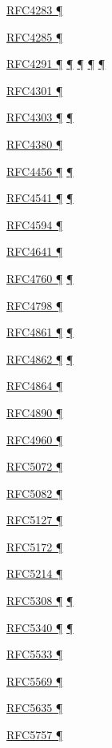 \documentclass[
]{article}
\begin{document}
\hyperref[obsolete-features-in-ipv6]{RFC4283 ¶}

\hyperref[obsolete-features-in-ipv6]{RFC4285 ¶}

\hyperref[address-resolution]{RFC4291 ¶} \hyperref[addresses]{¶}
\hyperref[filtering]{¶} \hyperref[obsolete-features-in-ipv6]{¶}
\hyperref[markdown-usage]{¶}

\hyperref[security]{RFC4301 ¶}

\hyperref[extension-headers-and-options]{RFC4303 ¶}
\hyperref[packet-format]{¶}

\hyperref[obsolete-techniques]{RFC4380 ¶}

\hyperref[routing]{RFC4456 ¶} \hyperref[routing-operation]{¶}

\hyperref[address-resolution]{RFC4541 ¶}
\hyperref[layer-2-considerations]{¶}

\hyperref[traffic-class-and-flow-label]{RFC4594 ¶}

\hyperref[filtering]{RFC4641 ¶}

\hyperref[routing]{RFC4760 ¶} \hyperref[routing-operation]{¶}

\hyperref[tunnels]{RFC4798 ¶}

\hyperref[address-resolution]{RFC4861 ¶}
\hyperref[auto-configuration]{¶}

\hyperref[auto-configuration]{RFC4862 ¶}
\hyperref[address-and-prefix-management]{¶}

\hyperref[topology-obfuscation]{RFC4864 ¶}

\hyperref[filtering]{RFC4890 ¶}

\hyperref[transport-protocols]{RFC4960 ¶}

\hyperref[layer-2-functions]{RFC5072 ¶}

\hyperref[filtering]{RFC5082 ¶}

\hyperref[traffic-class-and-flow-label]{RFC5127 ¶}

\hyperref[layer-2-functions]{RFC5172 ¶}

\hyperref[obsolete-techniques]{RFC5214 ¶}

\hyperref[routing]{RFC5308 ¶} \hyperref[routing-operation]{¶}

\hyperref[routing]{RFC5340 ¶} \hyperref[routing-operation]{¶}

\hyperref[multihoming]{RFC5533 ¶}

\hyperref[obsolete-techniques]{RFC5569 ¶}

\hyperref[filtering]{RFC5635 ¶}

\hyperref[address-resolution]{RFC5757 ¶}
\end{document}
